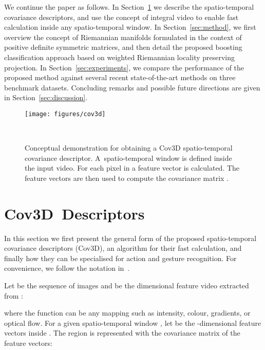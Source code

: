 \documentclass[10pt,twocolumn,letterpaper]{article}
\newcommand{\eqsize}{\footnotesize}
\newcommand{\cov}{{Cov3D}}
\begin{document}
We continue the paper as follows.
In Section~\ref{sec:cov3d} we describe the spatio-temporal covariance descriptors,
and use the concept of integral video to enable fast calculation inside any spatio-temporal window.
In Section~\ref{sec:method}, we first overview the concept of Riemannian manifolds formulated in the context of positive definite symmetric matrices,
and then detail the proposed boosting classification approach based on weighted Riemannian locality preserving projection.
In Section~\ref{sec:experiments}, we compare the performance of the proposed method against several recent state-of-the-art methods
on three benchmark datasets.
Concluding remarks and possible future directions are given in Section~\ref{sec:discussion}.
\begin{figure}[!b]
  \centering
  \texttt{[image: figures/cov3d]}
  
  ~
  
  \caption
    {
    \small
    Conceptual demonstration for obtaining a {\cov} spatio-temporal covariance descriptor.
    A~spatio-temporal window {\eqsize } is defined inside the input video.
    For each pixel in {\eqsize } a feature vector {\eqsize } is calculated.
    The feature vectors are then used to compute the covariance matrix {\eqsize }.
    }
  \label{fig:cov3d}
\end{figure}


\section{\cov~Descriptors}
\label{sec:cov3d}

In this section we first present the general form of the proposed spatio-temporal covariance descriptors (\cov),
an algorithm for their fast calculation,
and finally how they can be specialised for action and gesture recognition.
For convenience, we follow the notation in~\cite{TuzelEtAl2008}.

Let {\eqsize } be the sequence of images {\eqsize }
and {\eqsize } be the {\eqsize } dimensional feature video extracted from {\eqsize }:

\vspace{-1ex}
\eqsize

\normalsize

\noindent
where the function {\eqsize } can be any mapping such as intensity, colour, gradients, or optical flow.
For a given spatio-temporal window {\eqsize },
let {\eqsize } be the {\eqsize }-dimensional feature vectors inside {\eqsize }.
The region {\eqsize } is represented with the
{\eqsize } covariance matrix of the feature vectors:
\end{document}
